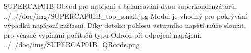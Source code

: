 \uvod
{SUPERCAP01B}
{Obvod pro nabíjení a balancování dvou superkondenzátorů.}
{}
{../..//doc/img/SUPERCAP01B_top_small.jpg}
{Modul je vhodný pro pokrývání výpadků napájení zařízení. Díky detekci poklesu vstupního napětí může sloužit, pro včasné vypínání počítačů typu Odroid při odpojení napájení.}
{ }
{../../doc/img/SUPERCAP01B_QRcode.png}